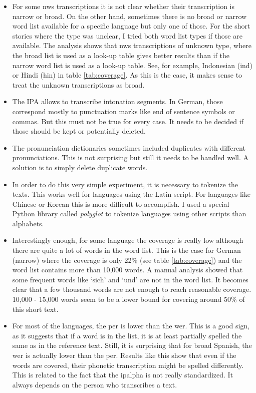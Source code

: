 \begin{itemize}
\item For some \ac{nws} transcriptions it is not clear whether their transcription is narrow or broad. On the other hand, sometimes there is no broad or narrow word list available for a specific language but only one of those. For the short stories where the type was unclear, I tried both word list types if those are available. The analysis shows that \ac{nws} transcriptions of unknown type, where the broad list is used as a look-up table gives better results than if the narrow word list is used as a look-up table. See, for example, Indonesian (ind) or Hindi (hin) in table \ref{tab:coverage}. As this is the case, it makes sense to treat the unknown transcriptions as broad. 
\item The IPA allows to transcribe intonation segments. In German, those correspond mostly to punctuation marks like end of sentence symbols or commas. But this must not be true for every case. It needs to be decided if those should be kept or potentially deleted.
\item The pronunciation dictionaries sometimes included duplicates with different pronunciations. This is not surprising but still it needs to be handled well. A solution is to simply delete duplicate words.
\item In order to do this very simple experiment, it is necessary to tokenize the texts. This works well for languages using the Latin script. For languages like Chinese or Korean this is more difficult to accomplish. I used a special Python library called \textit{polyglot} to tokenize languages using other scripts than alphabets.
\item Interestingly enough, for some language the coverage is really low although there are quite a lot of words in the word list. This is the case for German (narrow) where the coverage is only 22\% (see table \ref{tab:coverage}) and the word list contains more than 10,000 words. A manual analysis showed that some frequent words like `sich' and `und' are not in the word list. It becomes clear that a few thousand words are not enough to reach reasonable coverage. 10,000 - 15,000 words seem to be a lower bound for covering around 50\% of this short text.
\item For most of the languages, the \ac{per} is lower than the \ac{wer}. This is a good sign, as it suggests that if a word is in the list, it is at least partially spelled the same as in the reference text. Still, it is surprising that for broad Spanish, the \ac{wer} is actually lower than the \ac{per}. Results like this show that even if the words are covered, their phonetic transcription might be spelled differently. This is related to the fact that the \ac{ipalpha} is not really standardized. It always depends on the person who transcribes a text.
\end{itemize}


